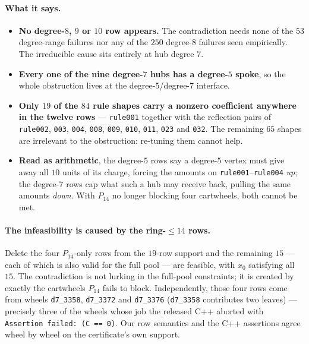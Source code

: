 \documentclass[11pt]{article}
\theoremstyle{definition}
\begin{document}
\paragraph{What it says.}
\begin{itemize}\itemsep2pt
  \item \textbf{No degree-$8$, $9$ or $10$ row appears.} The contradiction needs
        none of the $53$ degree-range failures nor any of the $250$ degree-$8$
        failures seen empirically. The irreducible cause sits entirely at hub
        degree $7$.
  \item \textbf{Every one of the nine degree-$7$ hubs has a degree-$5$ spoke},
        so the whole obstruction lives at the degree-$5$/degree-$7$ interface.
  \item \textbf{Only $19$ of the $84$ rule shapes carry a nonzero coefficient
        anywhere in the twelve rows} --- \texttt{rule001} together with the
        reflection pairs of \texttt{rule002}, \texttt{003}, \texttt{004},
        \texttt{008}, \texttt{009}, \texttt{010}, \texttt{011}, \texttt{023} and
        \texttt{032}. The remaining $65$ shapes are irrelevant to the
        obstruction: re-tuning them cannot help.
  \item \textbf{Read as arithmetic}, the degree-$5$ rows say a degree-$5$ vertex
        must give away all $10$ units of its charge, forcing the amounts on
        \texttt{rule001}--\texttt{rule004} \emph{up}; the degree-$7$ rows cap what
        such a hub may receive back, pulling the same amounts \emph{down}. With
        $P_{14}$ no longer blocking four cartwheels, both cannot be met.
\end{itemize}

\paragraph{The infeasibility is caused by the ring-$\le14$ rows.} Delete the four
$P_{14}$-only rows from the $19$-row support and the remaining $15$ --- each of
which is also valid for the full pool --- are feasible, with $x_0$ satisfying all
$15$. The contradiction is not lurking in the full-pool constraints; it is
created by exactly the cartwheels $P_{14}$ fails to block. Independently, those
four rows come from wheels \texttt{d7\_3358}, \texttt{d7\_3372} and
\texttt{d7\_3376} (\texttt{d7\_3358} contributes two leaves) --- precisely three
of the wheels whose job the released C++ aborted with
\texttt{Assertion failed: (C == 0)}. Our row semantics and the C++ assertions
agree wheel by wheel on the certificate's own support.
\end{document}
